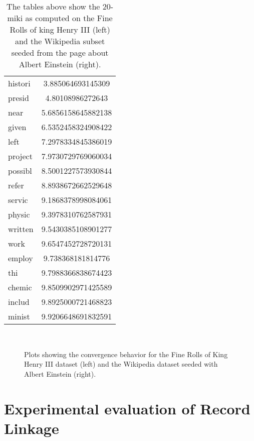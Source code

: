 \begin{table}
\begin{minipage}{.5\textwidth}
\begin{tabular}{l S[round-precision=4]}
    		histori & 3.885064693145309\\
    		presid & 4.80108986272643\\
    		near & 5.6856158645882138\\
    		given & 6.5352458324908422\\
    		left & 7.2978334845386019\\
    		project & 7.9730729769060034\\
    		possibl & 8.5001227573930844\\
    		refer & 8.8938672662529648\\
    		servic & 9.1868378998084061\\
    		physic & 9.3978310762587931\\
    		written & 9.5430385108901277\\
    		work & 9.6547452728720131\\
    		employ & 9.738368181814776\\
    		thi & 9.7988366838674423\\
    		chemic & 9.8509902971425589\\
    		includ & 9.8925000721468823\\
    		minist & 9.9206648691832591\\
    		\bottomrule
    	\end{tabular}
    	\label{t:miki_wikipedia}
    \end{minipage}
    \caption[Joint entropy of extracted 20-mikis]{The tables above show the 20-miki as computed on the Fine Rolls of king Henry III (left) and the Wikipedia subset seeded from the page about Albert Einstein (right).}
\end{table}

\begin{figure}
    ~
    
    \caption{Plots showing the convergence behavior for the Fine Rolls of King Henry III dataset (left) and the Wikipedia dataset seeded with Albert Einstein (right).}\label{fig:1}
\end{figure}




\section{Experimental evaluation of Record Linkage}
\label{sec:record_linkage_evaluation}